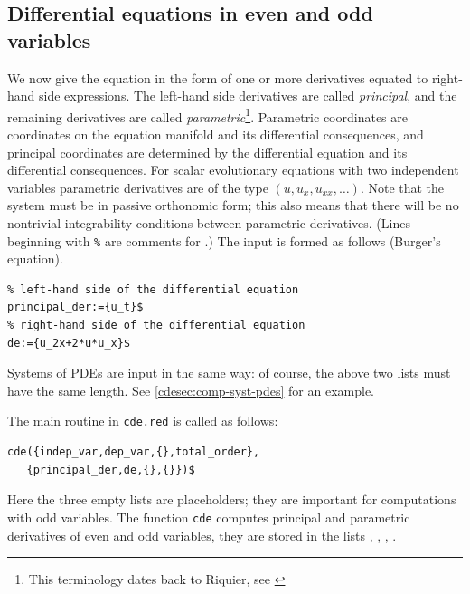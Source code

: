 \subsection{Differential equations in even and odd variables}
\label{cdesec:diff-equat-even}

We now give the equation in the form of one or more derivatives equated to
right-hand side expressions. The left-hand side derivatives are called
\emph{principal}, and the remaining derivatives are called
\emph{parametric}\footnote{This terminology dates back to Riquier, see
  \cite{Marvan:2009}}. Parametric coordinates are coordinates on the equation manifold
and its differential consequences, and principal coordinates are determined
by the differential equation and its differential consequences.  For scalar
evolutionary equations with two independent variables parametric derivatives
are of the type $(u,u_x,u_{xx},\ldots)$.  Note that the system must be in
passive orthonomic form; this also means that there will be no nontrivial
integrability conditions between parametric derivatives. (Lines
beginning with \texttt{\%} are comments for \REDUCE.) The input is formed as
follows (Burger's equation).
\hypertarget{variable:PRINCIPAL_DER}{}
\begin{verbatim}
% left-hand side of the differential equation
principal_der:={u_t}$
% right-hand side of the differential equation
de:={u_2x+2*u*u_x}$
\end{verbatim}
Systems of PDEs are input in the same way: of course, the above two lists must
have the same length. See \ref{cdesec:comp-syst-pdes} for an example.

The main routine in \texttt{cde.red} is called as follows:
\begin{verbatim}
cde({indep_var,dep_var,{},total_order},
   {principal_der,de,{},{}})$
\end{verbatim}
\hypertarget{variable:ALL_PRINCIPAL_DER}{}
\hypertarget{variable:ALL_PRINCIPAL_ODD}{}
\hypertarget{variable:ALL_PARAMETRIC_DER}{}
\hypertarget{variable:ALL_PARAMETRIC_ODD}{}
Here the three empty lists are placeholders; they are important for
computations with odd variables. The function \texttt{cde}
computes principal and parametric derivatives of even and odd variables, they are
stored in the lists , ,
, .


